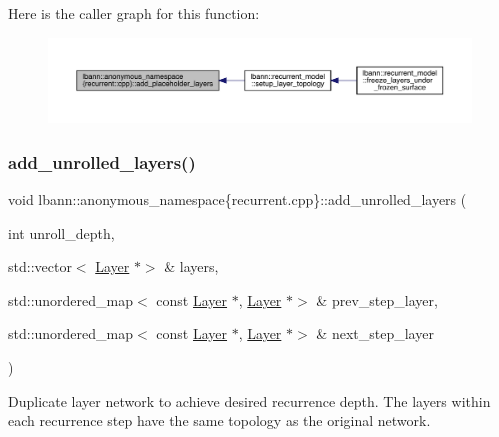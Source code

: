 Here is the caller graph for this function\+:\nopagebreak
\begin{figure}[H]
\begin{center}
\leavevmode
\includegraphics[width=350pt]{namespacelbann_1_1anonymous__namespace_02recurrent_8cpp_03_a50bca1c07c6f3146947b2a0fb5cc815a_icgraph}
\end{center}
\end{figure}
\mbox{\label{namespacelbann_1_1anonymous__namespace_02recurrent_8cpp_03_a16733e1fb301c3099a5fe07d703c3782}} 
\subsubsection{\texorpdfstring{add\+\_\+unrolled\+\_\+layers()}{add\_unrolled\_layers()}}
{\footnotesize\ttfamily void lbann\+::anonymous\+\_\+namespace\{recurrent.\+cpp\}\+::add\+\_\+unrolled\+\_\+layers (\begin{DoxyParamCaption}\item[{int}]{unroll\+\_\+depth,  }\item[{std\+::vector$<$ \hyperlink{classlbann_1_1Layer}{Layer} $\ast$$>$ \&}]{layers,  }\item[{std\+::unordered\+\_\+map$<$ const \hyperlink{classlbann_1_1Layer}{Layer} $\ast$, \hyperlink{classlbann_1_1Layer}{Layer} $\ast$$>$ \&}]{prev\+\_\+step\+\_\+layer,  }\item[{std\+::unordered\+\_\+map$<$ const \hyperlink{classlbann_1_1Layer}{Layer} $\ast$, \hyperlink{classlbann_1_1Layer}{Layer} $\ast$$>$ \&}]{next\+\_\+step\+\_\+layer }\end{DoxyParamCaption})}

Duplicate layer network to achieve desired recurrence depth. The layers within each recurrence step have the same topology as the original network. 

